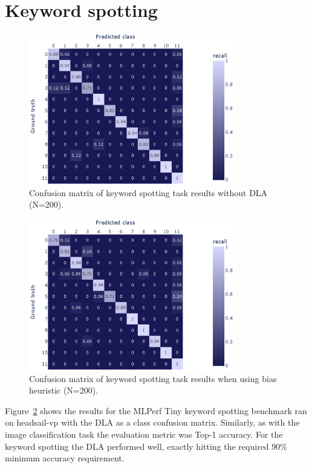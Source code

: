 \documentclass[12pt,a4paper,english
]{tunithesis}
\begin{document}
\section{Keyword spotting}

\begin{figure}[h]
  \centering
  \includegraphics[width=0.8\textwidth]{img/kws_200_no_acc.eps}
  \caption{Confusion matrix of keyword spotting task results without DLA (N=200).}
  \label{fig:kws-results-no-acc}
\end{figure}
\begin{figure}[h]
  \centering
  \includegraphics[width=0.8\textwidth]{img/kws_200_abs_heuristic.eps}
  \caption{Confusion matrix of keyword spotting task results when using bias heuristic (N=200).}
  \label{fig:kws-results}
\end{figure}


Figure~\ref{fig:kws-results} shows the results for the MLPerf Tiny keyword spotting benchmark ran on headsail-vp with the DLA as a class confusion matrix. Similarly, as with the image classification task the evaluation metric was Top-1 accuracy. For the keyword spotting the DLA performed well, exactly hitting the required $90\%$ minimum accuracy requirement.
\end{document}
